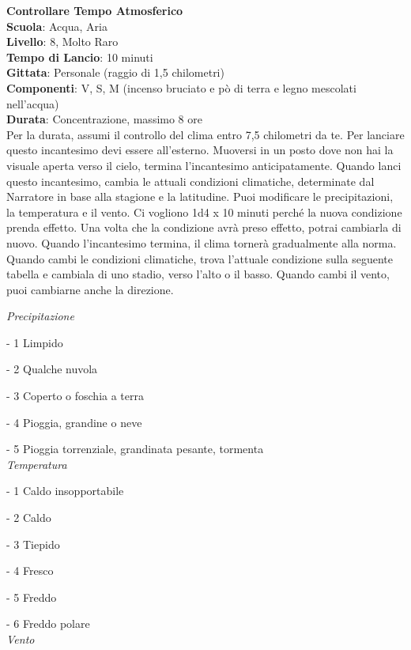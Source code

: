 \begin{multicols}{2}
\medskip\textbf{Controllare Tempo Atmosferico}\\
\textbf{Scuola}: Acqua, Aria\\
\textbf{Livello}: 8, Molto Raro\\
\textbf{Tempo di Lancio}: 10 minuti\\
\textbf{Gittata}: Personale (raggio di 1,5 chilometri)\\
\textbf{Componenti}: V, S, M (incenso bruciato e pò di terra e legno mescolati nell'acqua)\\
\textbf{Durata}: Concentrazione, massimo 8 ore \\
Per la durata, assumi il controllo del clima entro 7,5 chilometri da te. Per lanciare questo incantesimo devi essere all'esterno. Muoversi in un posto dove non hai la visuale aperta verso il cielo, termina l'incantesimo anticipatamente. Quando lanci questo incantesimo, cambia le attuali condizioni climatiche, determinate dal Narratore in base alla stagione e la latitudine. Puoi modificare le precipitazioni, la temperatura e il vento. Ci vogliono 1d4 x 10 minuti perché la nuova condizione prenda effetto. Una volta che la condizione avrà preso effetto, potrai cambiarla di nuovo. Quando l'incantesimo termina, il clima tornerà gradualmente alla norma.\\
Quando cambi le condizioni climatiche, trova l'attuale condizione sulla seguente tabella e cambiala di uno stadio, verso l'alto o il basso. Quando cambi il vento, puoi cambiarne anche la direzione.

\medskip

\textit{Precipitazione}

- 1 Limpido

- 2 Qualche nuvola

- 3 Coperto o foschia a terra

- 4 Pioggia, grandine o neve

- 5 Pioggia torrenziale, grandinata pesante, tormenta\\

\textit{Temperatura}

- 1 Caldo insopportabile

- 2 Caldo

- 3 Tiepido

- 4 Fresco

- 5 Freddo

- 6 Freddo polare\\

\textit{Vento}


\end{multicols}
